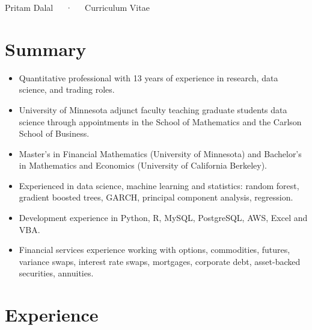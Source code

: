 \documentclass[11pt, a4paper]{awesome-cv}
\begin{document}
\makecvheader

\makecvfooter
  {}
    {Pritam Dalal~~~·~~~Curriculum Vitae}
  {\thepage}





\hypertarget{summary}{%
\section{Summary}\label{summary}}

\begin{itemize}
\item
  Quantitative professional with 13 years of experience in research,
  data science, and trading roles.
\item
  University of Minnesota adjunct faculty teaching graduate students
  data science through appointments in the School of Mathematics and the
  Carlson School of Business.
\item
  Master's in Financial Mathematics (University of Minnesota) and
  Bachelor's in Mathematics and Economics (University of California
  Berkeley).
\item
  Experienced in data science, machine learning and statistics: random
  forest, gradient boosted trees, GARCH, principal component analysis,
  regression.
\item
  Development experience in Python, R, MySQL, PostgreSQL, AWS, Excel and
  VBA.
\item
  Financial services experience working with options, commodities,
  futures, variance swaps, interest rate swaps, mortgages, corporate
  debt, asset-backed securities, annuities.
\end{itemize}

\hypertarget{experience}{%
\section{Experience}\label{experience}}
\end{document}
